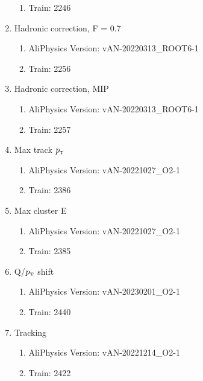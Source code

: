 \documentclass[ALICE]{ALICE_analysis_notes}
\newcommand{\pT}{$p_{\mbox{\tiny T}}$\xspace}
\begin{document}
\begin{appendix}
\begin{enumerate}
\begin{enumerate}
        \item Train: 2246
    \end{enumerate}
    \item Hadronic correction, F = 0.7
    \begin{enumerate}
        \item AliPhysics Version: vAN-20220313\_ROOT6-1
        \item Train: 2256
    \end{enumerate}
    \item Hadronic correction, MIP
    \begin{enumerate}
        \item AliPhysics Version: vAN-20220313\_ROOT6-1
        \item Train: 2257
    \end{enumerate}
    \item Max track \pT
    \begin{enumerate}
        \item AliPhysics Version: vAN-20221027\_O2-1
        \item Train: 2386
    \end{enumerate}
    \item Max cluster E
    \begin{enumerate}
        \item AliPhysics Version: vAN-20221027\_O2-1
        \item Train: 2385
    \end{enumerate}
    \item Q/\pT shift
    \begin{enumerate}
        \item AliPhysics Version: vAN-20230201\_O2-1
        \item Train: 2440
    \end{enumerate}
    \item Tracking
    \begin{enumerate}
        \item AliPhysics Version: vAN-20221214\_O2-1
        \item Train: 2422
    \end{enumerate}
\end{enumerate}


\end{appendix}
\end{document}
